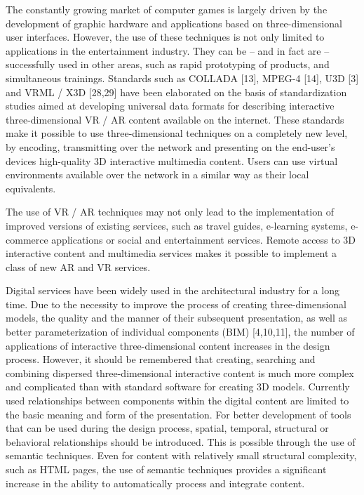 \documentclass[runningheads]{llncs}
\begin{document}
The constantly growing market of computer games is largely driven by the development of graphic hardware and applications based on three-dimensional user interfaces. However, the use of these techniques is not only limited to applications in the entertainment industry. They can be – and in fact are – successfully used in other areas, such as rapid prototyping of products, and simultaneous trainings. Standards such as COLLADA [13], MPEG-4 [14], U3D [3] and VRML / X3D [28,29] have been elaborated on the basis of standardization studies aimed at developing universal data formats for describing interactive three-dimensional VR / AR content available on the internet. These standards make it possible to use three-dimensional techniques on a completely new level, by encoding, transmitting over the network and presenting on the end-user's devices high-quality 3D interactive multimedia content. Users can use virtual environments available over the network in a similar way as their local equivalents.

The use of VR / AR techniques may not only lead to the implementation of improved versions of existing services, such as travel guides, e-learning systems, e-commerce applications or social and entertainment services. Remote access to 3D interactive content and multimedia services makes it possible to implement a class of new AR and VR services.

Digital services have been widely used in the architectural industry for a long time. Due to the necessity to improve the process of creating three-dimensional models, the quality and the manner of their subsequent presentation, as well as better parameterization of individual components (BIM) [4,10,11], the number of applications of interactive three-dimensional content increases in the design process. However, it should be remembered that creating, searching and combining dispersed three-dimensional interactive content is much more complex and complicated than with standard software for creating 3D models. Currently used relationships between components within the digital content are limited to the basic meaning and form of the presentation. For better development of tools that can be used during the design process, spatial, temporal, structural or behavioral relationships should be introduced. This is possible through the use of semantic techniques. Even for content with relatively small structural complexity, such as HTML pages, the use of semantic techniques provides a significant increase in the ability to automatically process and integrate content.
\end{document}
